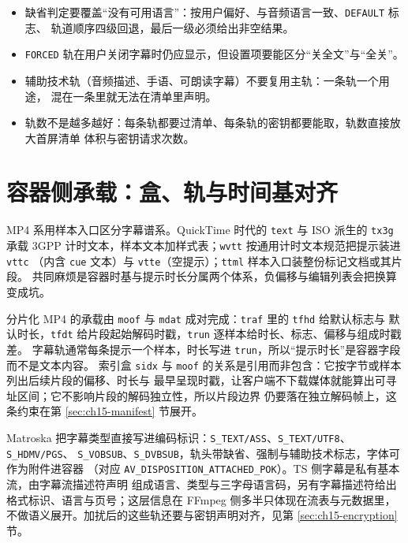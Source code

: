 \documentclass[12pt,a4paper,fontset=fandol]{ctexbook}
\newcommand{\Tp}[1]{\texttt{#1}}
\begin{document}
\begin{guideline}[title={选轨逻辑的四条硬规则}]
\begin{itemize}
\item 缺省判定要覆盖``没有可用语言''：按用户偏好、与音频语言一致、\Tp{DEFAULT} 标志、
      轨道顺序四级回退，最后一级必须给出非空结果。
\item \Tp{FORCED} 轨在用户关闭字幕时仍应显示，但设置项要能区分``关全文''与``全关''。
\item 辅助技术轨（音频描述、手语、可朗读字幕）不要复用主轨：一条轨一个用途，
      混在一条里就无法在清单里声明。
\item 轨数不是越多越好：每条轨都要过清单、每条轨的密钥都要能取，轨数直接放大首屏清单
      体积与密钥请求次数。
\end{itemize}
\end{guideline}

\section{容器侧承载：盒、轨与时间基对齐}
\label{sec:ch15-containers}

MP4 系用样本入口区分字幕谱系。QuickTime 时代的 \Tp{text} 与 ISO 派生的 \Tp{tx3g} 承载
3GPP 计时文本，样本文本加样式表；\Tp{wvtt} 按通用计时文本规范把提示装进 \Tp{vttc}
（内含 \Tp{cue} 文本）与 \Tp{vtte}（空提示）；\Tp{ttml} 样本入口装整份标记文档或其片段。
共同麻烦是容器时基与提示时长分属两个体系，负偏移与编辑列表会把换算变成坑。

分片化 MP4 的承载由 \Tp{moof} 与 \Tp{mdat} 成对完成：\Tp{traf} 里的 \Tp{tfhd} 给默认标志与
默认时长，\Tp{tfdt} 给片段起始解码时戳，\Tp{trun} 逐样本给时长、标志、偏移与组成时戳差。
字幕轨通常每条提示一个样本，时长写进 \Tp{trun}，所以``提示时长''是容器字段而不是文本内容。
索引盒 \Tp{sidx} 与 \Tp{moof} 的关系是引用而非包含：它按字节或样本列出后续片段的偏移、时长与
最早呈现时戳，让客户端不下载媒体就能算出可寻址区间；它不影响片段的解码独立性，所以片段边界
仍要落在独立解码帧上，这条约束在第 \ref{sec:ch15-manifest} 节展开。

Matroska 把字幕类型直接写进编码标识：\Tp{S\_TEXT/ASS}、\Tp{S\_TEXT/UTF8}、\Tp{S\_HDMV/PGS}、
\Tp{S\_VOBSUB}、\Tp{S\_DVBSUB}，轨头带缺省、强制与辅助技术标志，字体可作为附件进容器
（对应 \Tp{AV\_DISPOSITION\_ATTACHED\_POK}）。TS 侧字幕是私有基本流，由字幕流描述符声明
组成语言、类型与三字母语言码，另有字幕描述符给出格式标识、语言与页号；这层信息在 FFmpeg
侧多半只体现在流表与元数据里，不做语义展开。加扰后的这些轨还要与密钥声明对齐，见第
\ref{sec:ch15-encryption} 节。
\end{document}
